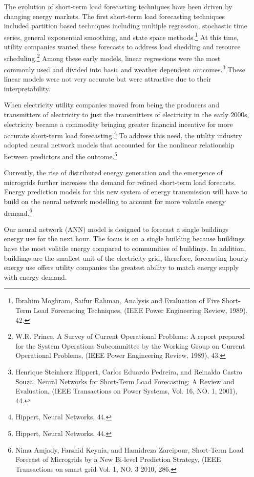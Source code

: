 \documentclass[twoside,11pt]{article}
\begin{document}
The evolution of short-term load forecasting techniques have been driven by changing energy markets. The first short-term load forecasting techniques included partition based techniques including multiple regression, stochastic time series, general exponential smoothing, and state space methods.\footnote{Ibrahim Moghram, Saifur Rahman, Analysis and Evaluation of Five Short-Term Load Forecasting Techniques, (IEEE Power Engineering Review, 1989), 42.} At this time, utility companies wanted these forecasts to address load shedding and resource scheduling.\footnote{W.R. Prince, A Survey of Current Operational Problems: A report prepared for the System Operations Subcommittee by the Working Group on Current Operational Problems, (IEEE Power Engineering Review, 1989), 43.} Among these early models, linear regressions were the most commonly used and divided into basic and weather dependent outcomes.\footnote{Henrique Steinherz Hippert, Carlos Eduardo Pedreira, and Reinaldo Castro Souza, Neural Networks for Short-Term Load Forecasting: A Review and Evaluation, (IEEE Transactions on Power Systems, Vol. 16, NO. 1, 2001), 44.} These linear models were not very accurate but were attractive due to their interpretability.

When electricity utility companies moved from being the producers and transmitters of electricity to just the transmitters of electricity in the early 2000s, electricity became a commodity bringing greater financial incentive for more accurate short-term load forecasting.\footnote{Hippert, Neural Networks, 44.} To address this need, the utility industry adopted neural network models that accounted for the nonlinear relationship between predictors and the outcome.\footnote{Hippert, Neural Networks, 44.}

Currently, the rise of distributed energy generation and the emergence of microgrids further increases the demand for refined short-term load forecasts. Energy prediction models for this new system of energy transmission will have to build on the neural network modelling to account for more volatile energy demand.\footnote{Nima Amjady, Farshid Keynia, and Hamidreza Zareipour, Short-Term Load Forecast of Microgrids by a New Bi-level Prediction Strategy, (IEEE Transactions on smart grid Vol. 1, NO. 3 2010, 286.} 
 
Our neural network (ANN) model is designed to forecast a single buildings energy use for the next hour. The focus is on a single building because buildings have the most volitile energy compared to communities of buildings. In addition, buildings are the smallest unit of the electricity grid, therefore, forecasting hourly energy use offers utility companies the greatest ability to match energy supply with energy demand. 
\end{document}
